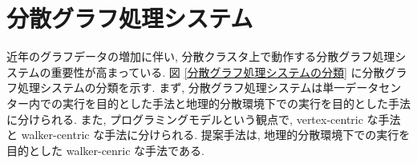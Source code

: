 \section{分散グラフ処理システム}\label{sec:分散グラフ処理システム}

近年のグラフデータの増加に伴い, 分散クラスタ上で動作する分散グラフ処理システムの重要性が高まっている. 図 \ref{分散グラフ処理システムの分類} に分散グラフ処理システムの分類を示す. まず, 分散グラフ処理システムは単一データセンター内での実行を目的とした手法と地理的分散環境下での実行を目的とした手法に分けられる. また, プログラミングモデルという観点で, vertex-centric な手法と walker-centric な手法に分けられる. 提案手法は, 地理的分散環境下での実行を目的とした walker-cenric な手法である. 


